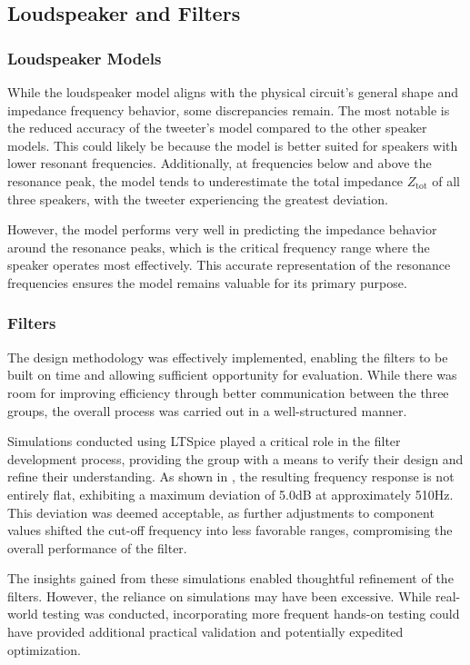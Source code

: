 \newpage
\subsection{Loudspeaker and Filters}
\subsubsection{Loudspeaker Models}
While the loudspeaker model aligns with the physical circuit's general shape and impedance frequency behavior, some discrepancies remain. The most notable is the reduced accuracy of the tweeter's model compared to the other speaker models. This could likely be because the model is better suited for speakers with lower resonant frequencies. Additionally, at frequencies below and above the resonance peak, the model tends to underestimate the total impedance $Z_{\text{tot}}$ of all three speakers, with the tweeter experiencing the greatest deviation.

However, the model performs very well in predicting the impedance behavior around the resonance peaks, which is the critical frequency range where the speaker operates most effectively. This accurate representation of the resonance frequencies ensures the model remains valuable for its primary purpose.

\subsubsection{Filters}
The design methodology was effectively implemented, enabling the filters to be built on time and allowing sufficient opportunity for evaluation. While there was room for improving efficiency through better communication between the three groups, the overall process was carried out in a well-structured manner.

Simulations conducted using LTSpice played a critical role in the filter development process, providing the group with a means to verify their design and refine their understanding. As shown in , the resulting frequency response is not entirely flat, exhibiting a maximum deviation of 5.0dB at approximately 510Hz. This deviation was deemed acceptable, as further adjustments to component values shifted the cut-off frequency into less favorable ranges, compromising the overall performance of the filter.

The insights gained from these simulations enabled thoughtful refinement of the filters. However, the reliance on simulations may have been excessive. While real-world testing was conducted, incorporating more frequent hands-on testing could have provided additional practical validation and potentially expedited optimization.

